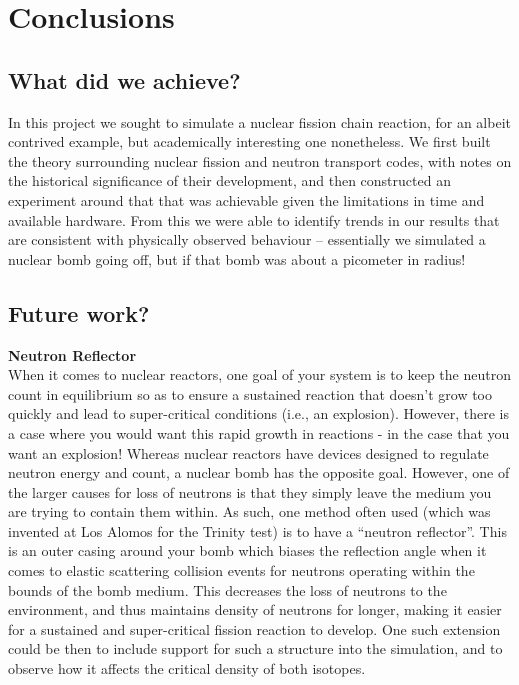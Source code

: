 \section{Conclusions}

\subsection{What did we achieve?}

In this project we sought to simulate a nuclear fission chain reaction, for an albeit contrived example, but 
academically interesting one nonetheless. We first built the theory surrounding nuclear fission and neutron transport codes, 
with notes on the historical significance of their development, and then constructed an experiment around that that was 
achievable given the limitations in time and available hardware. From this we were able to identify trends in our results that 
are consistent with physically observed behaviour -- essentially we simulated a nuclear bomb going off, but if that bomb was about 
a picometer in radius! 

\subsection{Future work?}


\textbf{Neutron Reflector} \\
When it comes to nuclear reactors, one goal of your system is to keep the neutron count in equilibrium so as to ensure a sustained 
reaction that doesn't grow too quickly and lead to super-critical conditions (i.e., an explosion). However, there is a case 
where you would want this rapid growth in reactions - in the case that you want an explosion! Whereas nuclear reactors have 
devices designed to regulate neutron energy and count, a nuclear bomb has the opposite goal. However, one of the larger 
causes for loss of neutrons is that they simply leave the medium you are trying to contain them within. As such, one 
method often used (which was invented at Los Alomos for the Trinity test) is to have a ``neutron reflector''. This is an 
outer casing around your bomb which biases the reflection angle when it comes to elastic scattering collision events for neutrons 
operating within the bounds of the bomb medium. This decreases the loss of neutrons to the environment, and thus maintains 
density of neutrons for longer, making it easier for a sustained and super-critical fission reaction to develop. One such extension 
could be then to include support for such a structure into the simulation, and to observe how it affects the critical density of both 
isotopes. 

